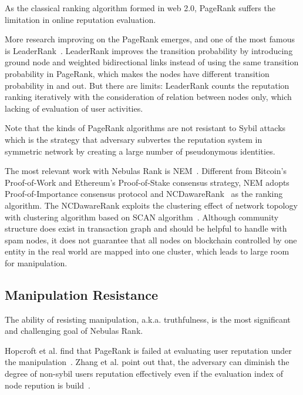 As the classical ranking algorithm formed in web 2.0, PageRank suffers the limitation in online reputation evaluation.


More research improving on the PageRank emerges, and one of the most famous is LeaderRank~\cite{Li2014}. LeaderRank improves the transition probability by introducing ground node and weighted bidirectional links instead of using the same transition probability in PageRank, which makes the nodes have different transition probability in and out. But there are limits: LeaderRank counts the reputation ranking iteratively with the consideration of relation between nodes only, which lacking of evaluation of user activities. 


Note that the kinds of PageRank algorithms are not resistant to Sybil attacks~\cite{cheng2006manipulability} which is the strategy that adversary subvertes the reputation system in symmetric network by creating a large number of pseudonymous identities.

The most relevant work with Nebulas Rank is NEM~\cite{nem}. Different from Bitcoin's Proof-of-Work and Ethereum's Proof-of-Stake consensus strategy, NEM adopts Proof-of-Importance consensus protocol and NCDawareRank~\cite{Nikolakopoulos2013} as the ranking algorithm. The NCDawareRank exploits the clustering effect of network topology with clustering algorithm based on SCAN algorithm~\cite{xu2007scan}\cite{shiokawa2015scan}\cite{chang2017mathsf}. Although community structure does exist in transaction graph and should be helpful to handle with spam nodes, it does not guarantee that all nodes on blockchain controlled by one entity in the real world are mapped into one cluster, which leads to large room for manipulation.


\subsection{Manipulation Resistance}
The ability of resisting manipulation, a.k.a. truthfulness, is the most significant and challenging goal of Nebulas Rank. 

Hopcroft et al. find that PageRank is failed at evaluating user reputation under the manipulation~\cite{hopcroft2007manipulation}. Zhang et al. point out that, the adversary can diminish the degree of non-sybil users reputation effectively even if the evaluation index of node repution is build~\cite{zhang2016truetop}.

